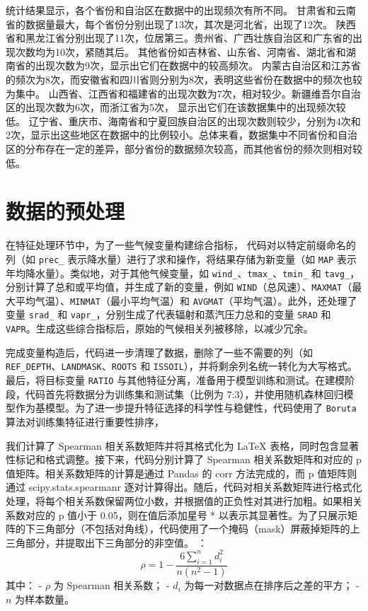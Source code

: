 \documentclass[AutoFakeBold]{LZUThesis-PgD&PhD}
\begin{document}
	
	统计结果显示，各个省份和自治区在数据中的出现频次有所不同。
	甘肃省和云南省的数据量最大，每个省份分别出现了13次，其次是河北省，出现了12次。
	陕西省和黑龙江省分别出现了11次，位居第三。贵州省、广西壮族自治区和广东省的出现次数均为10次，紧随其后。
	其他省份如吉林省、山东省、河南省、湖北省和湖南省的出现次数为9次，显示出它们在数据中的较高频次。
	内蒙古自治区和江苏省的频次为8次，而安徽省和四川省则分别为8次，表明这些省份在数据中的频次也较为集中。
	山西省、江西省和福建省的出现次数为7次，相对较少。新疆维吾尔自治区的出现次数为6次，而浙江省为5次，
	显示出它们在该数据集中的出现频次较低。
	辽宁省、重庆市、海南省和宁夏回族自治区的出现次数则较少，分别为4次和2次，显示出这些地区在数据中的比例较小。总体来看，数据集中不同省份和自治区的分布存在一定的差异，部分省份的数据频次较高，而其他省份的频次则相对较低。
	
	
	\section{数据的预处理}
	
	在特征处理环节中，为了一些气候变量构建综合指标，
	代码对以特定前缀命名的列（如 \texttt{prec\_} 表示降水量）进行了求和操作，将结果存储为新变量（如 \texttt{MAP} 表示年均降水量）。类似地，对于其他气候变量，如 \texttt{wind\_}、\texttt{tmax\_}、\texttt{tmin\_} 和 \texttt{tavg\_}，分别计算了总和或平均值，并生成了新的变量，例如 \texttt{WIND}（总风速）、\texttt{MAXMAT}（最大平均气温）、\texttt{MINMAT}（最小平均气温）和 \texttt{AVGMAT}（平均气温）。此外，还处理了变量 \texttt{srad\_} 和 \texttt{vapr\_}，分别生成了代表辐射和蒸汽压力总和的变量 \texttt{SRAD} 和 \texttt{VAPR}。生成这些综合指标后，原始的气候相关列被移除，以减少冗余。
	
	完成变量构造后，代码进一步清理了数据，删除了一些不需要的列（如 \texttt{REF\_DEPTH}、\texttt{LANDMASK}、\texttt{ROOTS} 和 \texttt{ISSOIL}），并将剩余列名统一转化为大写格式。最后，将目标变量 \texttt{RATIO} 与其他特征分离，准备用于模型训练和测试。在建模阶段，代码首先将数据分为训练集和测试集（比例为 7:3），并使用随机森林回归模型作为基模型。为了进一步提升特征选择的科学性与稳健性，代码使用了 \texttt{Boruta} 算法对训练集特征进行重要性排序，
	
	
	我们计算了 Spearman 相关系数矩阵并将其格式化为 LaTeX 表格，同时包含显著性标记和格式调整。接下来，代码分别计算了 Spearman 相关系数矩阵和对应的 p 值矩阵。相关系数矩阵的计算是通过 Pandas 的 corr 方法完成的，而 p 值矩阵则通过 scipy.stats.spearmanr 逐对计算得出。随后，代码对相关系数矩阵进行格式化处理，将每个相关系数保留两位小数，并根据值的正负性对其进行加粗。如果相关系数对应的 p 值小于 0.05，则在值后添加星号 * 以表示其显著性。为了只展示矩阵的下三角部分（不包括对角线），代码使用了一个掩码（mask）屏蔽掉矩阵的上三角部分，并提取出下三角部分的非空值。
	：
	\[
	\rho = 1 - \frac{6 \sum_{i=1}^{n} d_i^2}{n(n^2 - 1)}
	\]
	其中：
	- \( \rho \) 为 Spearman 相关系数；
	- \( d_i \) 为每一对数据点在排序后之差的平方；
	- \( n \) 为样本数量。
	
\end{document}
